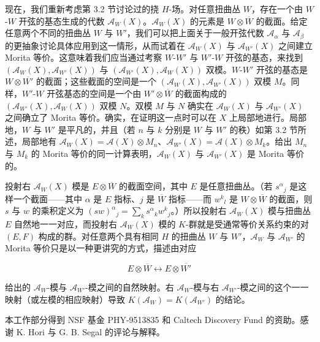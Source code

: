 现在，我们重新考虑第 3.2 节讨论过的挠 \(H\)-场。对任意扭曲丛 \(W\)，存在一个由 \(W\)-\(W\) 开弦的基态生成的代数 \({\mathcal A}_W(X)\)。\({\mathcal A}_W(X)\) 的元素是 \(W\otimes \overline W\) 的截面。给定任意两个不同的扭曲丛 \(W\) 与 \(W'\)，我们可以把上面关于一般开弦代数 \({\mathcal A}_\alpha\) 与 \({\mathcal A}_\beta\) 的更抽象讨论具体应用到这一情形，从而试着在 \({\mathcal A}_W(X)\) 与 \({\mathcal A}_{W'}(X)\) 之间建立 Morita 等价。这意味着我们应当通过考察 \(W\)-\(W'\) 与 \(W'\)-\(W\) 开弦的基态，来找到 \(({\mathcal A}_W(X),{\mathcal A}_{W'}(X))\) 与 \(({\mathcal A}_{W'}(X),{\mathcal A}_W(X))\) 双模。\(W\)-\(W'\) 开弦的基态是 \(W\otimes \overline{W'}\) 的截面；这些截面的空间是一个 \(({\mathcal A}_W(X),{\mathcal A}_{W'}(X))\) 双模 \(M\)。同样，\(W'\)-\(W\) 开弦基态的空间是一个由 \(W'\otimes \overline W\) 的截面构成的 \(({\mathcal A}_{W'}(X),{\mathcal A}_W(X))\) 双模 \(N\)。双模 \(M\) 与 \(N\) 确实在 \({\mathcal A}_W(X)\) 与 \({\mathcal A}_{W'}(X)\) 之间确立了 Morita 等价。确实，在证明这一点时可以在 \(X\) 上局部地进行。局部地，\(W\) 与 \(W'\) 是平凡的，并且（若 \(n\) 与 \(k\) 分别是 \(W\) 与 \(W'\) 的秩）如第 3.2 节所述，局部地有 \({\mathcal A}_W(X)={\mathcal A}(X)\otimes M_n\)、\({\mathcal A}_{W'}(X)={\mathcal A}(X)\otimes M_k\)。给出 \(M_n\) 与 \(M_k\) 的 Morita 等价的同一计算表明，\({\mathcal A}_W(X)\) 与 \({\mathcal A}_{W'}(X)\) 是 Morita 等价的。

投射右 \({\mathcal A}_W(X)\) 模是 \(E\otimes \overline W\) 的截面空间，其中 \(E\) 是任意扭曲丛。（若 \(s^\alpha{}_j\) 是这样一个截面——其中 \(\alpha\) 是 \(E\) 指标、\(j\) 是 \(\overline W\) 指标——而 \(w^k{}_l\) 是 \(W\otimes \overline W\) 的截面，则 \(s\) 与 \(w\) 的乘积定义为 \((sw)^\alpha{}_j=\sum_ks^\alpha{}_kw^k{}_j\)。）所以投射右 \({\mathcal A}_W(X)\) 模与扭曲丛 \(E\) 自然地一一对应，而投射右 \({\mathcal A}_W(X)\) 模的 \(K\)-群就是受通常等价关系约束的对 \((E,F)\) 构成的群。对任意两个具有相同 \(H\) 的扭曲丛 \(W\) 与 \(W'\)，\({\mathcal A}_W\) 与 \({\mathcal A}_{W'}\) 的 Morita 等价只是以一种更讲究的方式，描述由对应

\begin{equation}\tag{4.2}\label{eq:4.2}
E\otimes \overline W \leftrightarrow E\otimes \overline{W'}
\end{equation}

给出的 \({\mathcal A}_W\)-模与 \({\mathcal A}_{W'}\)-模之间的自然映射。右 \({\mathcal A}_W\)-模与右 \({\mathcal A}_{W'}\)-模之间的这个一一映射（或左模的相应映射）导致 \(K({\mathcal A}_W)=K({\mathcal A}_{W'})\) 的结论。

本工作部分得到 NSF 基金 PHY-9513835 和 Caltech Discovery Fund 的资助。感谢 K. Hori 与 G. B. Segal 的评论与解释。

